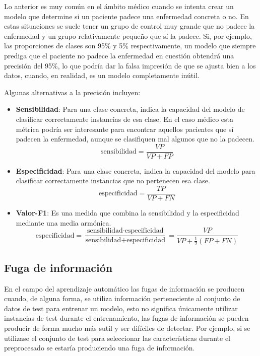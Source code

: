 Lo anterior es muy común en el ámbito médico cuando se intenta crear un modelo
que determine si un paciente padece una enfermedad concreta o no. En estas
situaciones se suele tener un grupo de control muy grande que no padece la
enfermedad y un grupo relativamente pequeño que sí la padece. Si, por ejemplo,
las proporciones de clases son 95\% y 5\% respectivamente, un modelo que siempre
prediga que el paciente no padece la enfermedad en cuestión obtendrá una
precisión del 95\%, lo que podría dar la falsa impresión de que se ajusta bien a
los datos, cuando, en realidad, es un modelo completamente inútil.

Algunas alternativas a la precisión incluyen:

\begin{itemize}
    \item \textbf{Sensibilidad}: Para una clase concreta, indica la capacidad
    del modelo de clasificar correctamente instancias de esa clase. En el caso
    médico esta métrica podría ser interesante para encontrar aquellos pacientes
    que sí padecen la enfermedad, aunque se clasifiquen mal algunos que no la
    padecen.
    $$
    \text{sensibilidad} = \frac{VP}{VP + FP}
    $$
    \item \textbf{Especificidad}: Para una clase concreta, indica la capacidad
    del modelo para clasificar correctamente instancias que no pertenecen esa
    clase.
    $$
    \text{especificidad} = \frac{TP}{VP + FN}
    $$
    \item \textbf{Valor-F1}: Es una medida que combina la sensibilidad y la
    especificidad mediante una media armónica.
    $$
    \text{especificidad}
    = \frac{\text{sensibilidad}\cdot\text{especificidad}}{\text{sensibilidad} + \text{especificidad}}
    = \frac{VP}{VP + \frac{1}{2}(FP + FN)}
    $$
\end{itemize}

\subsection{Fuga de información}

En el campo del aprendizaje automático las fugas de información se producen
cuando, de alguna forma, se utiliza información perteneciente al conjunto de
datos de test para entrenar un modelo, esto no significa únicamente utilizar
instancias de test durante el entrenamiento, las fugas de información se pueden
producir de forma mucho más sutil y ser difíciles de detectar. Por ejemplo, si
se utilizase el conjunto de test para seleccionar las características durante el
preprocesado se estaría produciendo una fuga de información.

